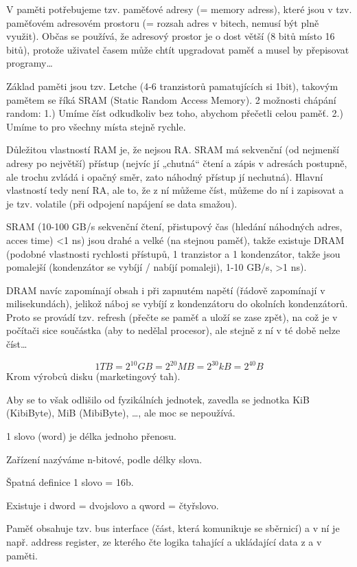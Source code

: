 \documentclass[12pt]{article}					%
\begin{document}
        \begin{priklady}
            V paměti potřebujeme tzv. paměťové adresy (= memory adress), které jsou v tzv. paměťovém adresovém prostoru (= rozsah adres v bitech, nemusí být plně využit). Občas se používá, že adresový prostor je o dost větší (8 bitů místo 16 bitů), protože uživatel časem může chtít upgradovat paměť a musel by přepisovat programy…

            Základ paměti jsou tzv. Letche (4-6 tranzistorů pamatujících si 1bit), takovým pamětem se říká SRAM (Static Random Access Memory). 2 možnosti chápání random: 1.) Umíme číst odkudkoliv bez toho, abychom přečetli celou paměť. 2.) Umíme to pro všechny místa stejně rychle.

            Důležitou vlastností RAM je, že nejsou RA. SRAM má sekvenční (od nejmenší adresy po největší) přístup (nejvíc jí „chutná“ čtení a zápis v adresách postupně, ale trochu zvládá i opačný směr, zato náhodný přístup jí nechutná). Hlavní vlastností tedy není RA, ale to, že z ní můžeme číst, můžeme do ní i zapisovat a je tzv. volatile (při odpojení napájení se data smažou).

            SRAM (10-100 GB/s sekvenční čtení, přistupový čas (hledání náhodných adres, acces time) <1 ns) jsou drahé a velké (na stejnou paměť), takže existuje DRAM (podobné vlastnosti rychlosti přístupů, 1 tranzistor a 1 kondenzátor, takže jsou pomalejší (kondenzátor se vybíjí / nabíjí pomaleji), 1-10 GB/s, >1 ns).

            DRAM navíc zapomínají obsah i při zapnutém napětí (řádově zapomínají v milisekundách), jelikož náboj se vybíjí z kondenzátoru do okolních kondenzátorů. Proto se provádí tzv. refresh (přečte se paměť a uloží se zase zpět), na což je v počítači sice součástka (aby to nedělal procesor), ale stejně z ní v té době nelze číst…


        \end{priklady}

        \begin{definice}[kB, MB, GB, TB]
            $$ 1TB = 2^{10}GB = 2^{20}MB = 2^{30}kB = 2^{40}B $$
            Krom výrobců disku (marketingový tah).

            Aby se to však odlišilo od fyzikálních jednotek, zavedla se jednotka KiB (KibiByte), MiB (MibiByte), …, ale moc se nepoužívá.
        \end{definice}

        \begin{definice}[Word]
            1 slovo (word) je délka jednoho přenosu.

            Zařízení nazýváme n-bitové, podle délky slova.

            Špatná definice 1 slovo = 16b.

            Existuje i dword = dvojslovo a qword = čtyřslovo.
        \end{definice}

        Paměť obsahuje tzv. bus interface (část, která komunikuje se sběrnicí) a v ní je např. address register, ze kterého čte logika tahající a ukládající data z a v paměti.
\end{document}

